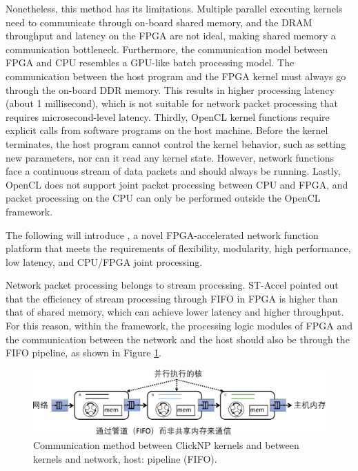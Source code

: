 Nonetheless, this method has its limitations. Multiple parallel executing kernels need to communicate through on-board shared memory, and the DRAM throughput and latency on the FPGA are not ideal, making shared memory a communication bottleneck. Furthermore, the communication model between FPGA and CPU resembles a GPU-like batch processing model. The communication between the host program and the FPGA kernel must always go through the on-board DDR memory. This results in higher processing latency (about 1 millisecond), which is not suitable for network packet processing that requires microsecond-level latency. Thirdly, OpenCL kernel functions require explicit calls from software programs on the host machine. Before the kernel terminates, the host program cannot control the kernel behavior, such as setting new parameters, nor can it read any kernel state. However, network functions face a continuous stream of data packets and should always be running. Lastly, OpenCL does not support joint packet processing between CPU and FPGA, and packet processing on the CPU can only be performed outside the OpenCL framework.

The following will introduce \name{}, a novel FPGA-accelerated network function platform that meets the requirements of flexibility, modularity, high performance, low latency, and CPU/FPGA joint processing.

Network packet processing belongs to stream processing. ST-Accel \cite{ruan2018st} pointed out that the efficiency of stream processing through FIFO in FPGA is higher than that of shared memory, which can achieve lower latency and higher throughput. For this reason, within the \name framework, the processing logic modules of FPGA and the communication between the network and the host should also be through the FIFO pipeline, as shown in Figure \ref{intro:fig:element_conn}.

\begin{figure}[htbp]
	\centering
	\includegraphics[width=1.0\textwidth]{image/element_conn.pdf}
	\caption{Communication method between ClickNP kernels and between kernels and network, host: pipeline (FIFO).}
	\label{intro:fig:element_conn}
\end{figure}

